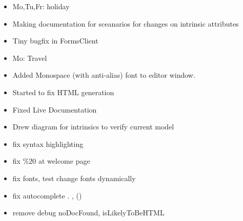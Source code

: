 \begin{itemize} 
\item Mo,Tu,Fr: holiday
\item Making documentation for sceanarios for changes on intrinsic attributes
\item Tiny bugfix in FormsClient
\end{itemize}

\begin{itemize} 
\item Mo: Travel
\item Added Monospace (with anti-alias) font to editor window.
\end{itemize}

\begin{itemize} 
\item Started to fix HTML generation
\end{itemize}

\begin{itemize} 
\item Fixed Live Documentation
\item Drew diagram for intrinsics to verify current model
\end{itemize}

\begin{itemize} 
\item fix syntax highlighting
\item fix \%20 at welcome page
\end{itemize}

\begin{itemize} 
\item fix fonts, test change fonts dynamically
\item fix autocomplete . , ()
\item remove debug noDocFound, isLikelyToBeHTML
\end{itemize}

